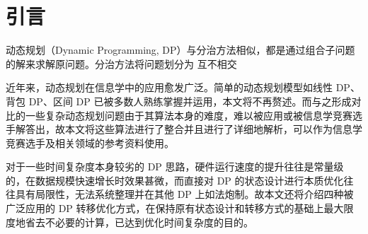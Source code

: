 
\chapter{引言}

动态规划（Dynamic Programming, DP）与分治方法相似，都是通过组合子问题的解来求解原问题。分治方法将问题划分为
互不相交

近年来，动态规划在信息学中的应用愈发广泛。简单的动态规划模型如线性 DP、背包
DP、区间 DP
已被多数人熟练掌握并运用，本文将不再赘述。而与之形成对比的一些复杂动态规划问题由于其算法本身的难度，难以被应用或被信息学竞赛选手解答出，故本文将这些算法进行了整合并且进行了详细地解析，可以作为信息学竞赛选手及相关领域的参考资料使用。

对于一些时间复杂度本身较劣的 DP
思路，硬件运行速度的提升往往是常量级的，在数据规模快速增长时效果甚微，而直接对
DP 的状态设计进行本质优化往往具有局限性，无法系统整理并在其他 DP
上如法炮制。故本文还将介绍四种被广泛应用的 DP
转移优化方式，在保持原有状态设计和转移方式的基础上最大限度地省去不必要的计算，已达到优化时间复杂度的目的。
